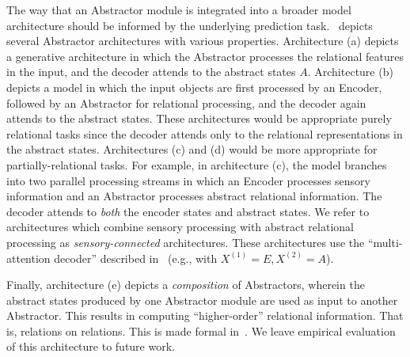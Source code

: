 The way that an Abstractor module is integrated into a broader model architecture should be informed by the underlying prediction task.~ depicts several Abstractor architectures with various properties. Architecture (a) depicts a generative architecture in which the Abstractor processes the relational features in the input, and the decoder attends to the abstract states $A$. Architecture (b) depicts a model in which the input objects are first processed by an Encoder, followed by an Abstractor for relational processing, and the decoder again attends to the abstract states. These architectures would be appropriate purely relational tasks since the decoder attends only to the relational representations in the abstract states. Architectures (c) and (d) would be more appropriate for partially-relational tasks. For example, in architecture (c), the model branches into two parallel processing streams in which an Encoder processes sensory information and an Abstractor processes abstract relational information. The decoder attends to \textit{both} the encoder states and abstract states. We refer to architectures which combine sensory processing with abstract relational processing as \textit{sensory-connected} architectures. These architectures use the ``multi-attention decoder'' described in~ (e.g., with $X^{(1)} = E, X^{(2)} = A$).

Finally, architecture (e) depicts a \textit{composition} of Abstractors, wherein the abstract states produced by one Abstractor module are used as input to another Abstractor. This results in computing ``higher-order'' relational information. That is, relations on relations. This is made formal in~. We leave empirical evaluation of this architecture to future work.

